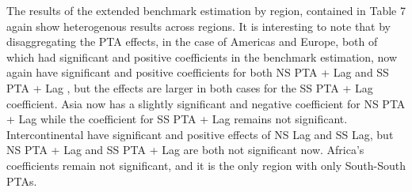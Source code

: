 \documentclass[12pt]{article}%
\begin{document}
The results of the extended benchmark estimation by region, contained in
Table 7 again show heterogenous results across regions. It is
interesting to note that by disaggregating the PTA effects, in the case
of Americas and Europe, both of which had significant and positive
coefficients in the benchmark estimation, now again have significant and
positive coefficients for both NS PTA + Lag and SS PTA + Lag , but the
effects are larger in both cases for the SS PTA + Lag coefficient. Asia
now has a slightly significant and negative coefficient for NS PTA + Lag
while the coefficient for SS PTA + Lag remains not significant.
Intercontinental have significant and positive effects of NS Lag and SS
Lag, but NS PTA + Lag and SS PTA + Lag are both not significant now.
Africa's coefficients remain not significant, and it is the only region
with only South-South PTAs.
%
%
\FloatBarrier

%
\end{document}
